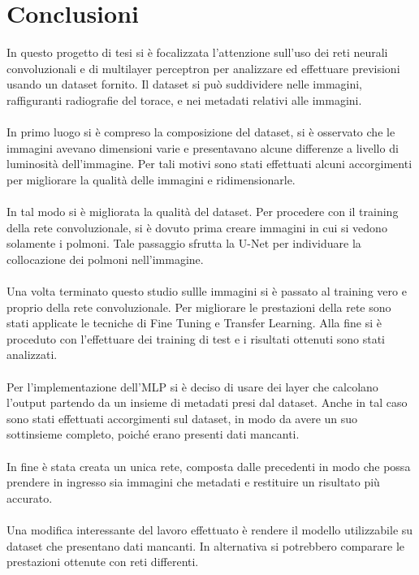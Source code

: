 \chapter*{Conclusioni}
In questo progetto di tesi si è focalizzata l'attenzione sull'uso dei reti neurali convoluzionali e di multilayer perceptron per analizzare ed effettuare 
previsioni usando un dataset fornito.
Il dataset si può suddividere nelle immagini, raffiguranti radiografie del torace, e nei metadati relativi alle immagini.
\\\\
In primo luogo si è compreso la composizione del dataset, si è osservato che le immagini avevano dimensioni varie e presentavano alcune differenze a livello 
di luminosità dell'immagine. Per tali motivi sono stati effettuati alcuni accorgimenti per migliorare la qualità delle immagini e ridimensionarle.
\\\\
In tal modo si è migliorata la qualità del dataset. Per procedere con il training della rete convoluzionale, si è dovuto prima creare immagini in cui si vedono solamente i polmoni.
Tale passaggio sfrutta la U-Net per individuare la collocazione dei polmoni nell'immagine.
\\\\
Una volta terminato questo studio sullle immagini si è passato al training vero e proprio della rete convoluzionale.
Per migliorare le prestazioni della rete sono stati applicate le tecniche di Fine Tuning e Transfer Learning.
Alla fine si è proceduto con l'effettuare dei training di test e i risultati ottenuti sono stati analizzati.
\\\\
Per l'implementazione dell'MLP si è deciso di usare dei layer che calcolano l'output partendo da un insieme di metadati presi dal dataset.
Anche in tal caso sono stati effettuati accorgimenti sul dataset, in modo da avere un suo sottinsieme completo, poiché erano presenti dati mancanti.
\\\\
In fine è stata creata un unica rete, composta dalle precedenti in modo che possa prendere in ingresso sia immagini che metadati e restituire un risultato più accurato.
\\\\
Una modifica interessante del lavoro effettuato è rendere il modello utilizzabile su dataset che presentano dati mancanti.
In alternativa si potrebbero comparare le prestazioni ottenute con reti differenti.